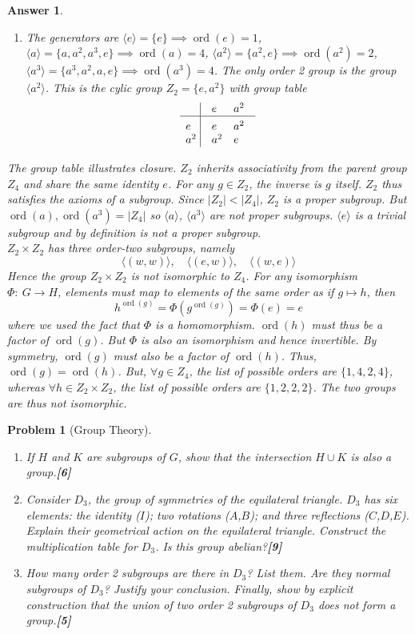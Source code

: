 \documentclass[a4paper]{article}
\DeclareMathOperator{\ord}{ord}
\newtheorem{ans}{Answer}[section]
\theoremstyle{new}
\newtheorem{qns}{Problem}[section]
\begin{document}
\begin{ans}
\begin{enumerate}[label=(\roman*)]
$${{    (w,w)  & (w,w)  &(w,e) & (e,w) & (e,e)     \cr
}}$$
\item The generators are $\langle e\rangle=\{e\}\implies\ord(e)=1$, $\langle a\rangle=\{a,a^2,a^3,e\}\implies\ord(a)=4$, $\langle a^2\rangle=\{a^2,e\}\implies\ord(a^2)=2$, $\langle a^3\rangle=\{a^3,a^2,a,e\}\implies\ord(a^3)=4$. The only order 2 group is the group $\langle a^2\rangle$. This is the cylic group $Z_2=\{e,a^2\}$ with group table
$$\vbox{\tabskip0.5em\offinterlineskip
    \halign{\strut$#$\hfil\ \tabskip1em\vrule&&$#$\hfil\cr
      & e&a^2     \cr
    \noalign{\hrule}\vrule height 12pt width 0pt
    e   & e&a^2      \cr
    a^2   & a^2&e      \cr
}}$$
\end{enumerate}
The group table illustrates closure. $Z_2$ inherits associativity from the parent group $Z_4$ and share the same identity $e$. For any $g\in Z_2$, the inverse is $g$ itself. $Z_2$ thus satisfies the axioms of a subgroup. Since $|Z_2|<|Z_4|$, $Z_2$ is a proper subgroup. But $\ord(a),\ord(a^3)=|Z_4|$ so $\langle a\rangle$, $\langle a^3\rangle$ are not proper subgroups. $\langle e\rangle$ is a trivial subgroup and by definition is not a proper subgroup.\\[5pt]
$Z_2\times Z_2$ has three order-two subgroups, namely 
$$\langle(w,w)\rangle,\quad\langle(e,w)\rangle,\quad\langle(w,e)\rangle$$
Hence the group $Z_2\times Z_2$ is not isomorphic to $Z_4$. For any isomorphism $\Phi:~G\rightarrow H$, elements must map to elements of the same order as if $g\mapsto h$, then 
$$h^{\ord(g)}=\Phi(g^{\ord(g)})=\Phi(e)=e$$
where we used the fact that $\Phi$ is a homomorphism. $\ord(h)$ must thus be a factor of $\ord(g)$. But $\Phi$ is also an isomorphism and hence invertible. By symmetry, $\ord(g)$ must also be a factor of $\ord(h)$. Thus, $\ord(g)=\ord(h)$. But, $\forall g\in Z_4$, the list of possible orders are $\{1,4,2,4\}$, whereas $\forall h\in Z_2\times Z_2$, the list of possible orders are $\{1,2,2,2\}$. The two groups are thus not isomorphic.
\end{ans}
\begin{qns}[Group Theory]\leavevmode
\begin{enumerate}[label=(\roman*)]
\item If $H$ and $K$ are subgroups of $G$, show that the intersection $H\cup K$ is also a group.\hfill\textbf{[6]}
\item Consider $D_3$, the group of symmetries of the equilateral triangle. $D_3$ has six elements: the identity ($I$); two rotations ($A$,$B$); and three reflections ($C$,$D$,$E$). Explain their geometrical action on the equilateral triangle. Construct the multiplication table for $D_3$. Is this group abelian?\hfill\textbf{[9]}
\item How many order 2 subgroups are there in $D_3$? List them. Are they normal subgroups of $D_3$? Justify your conclusion. Finally, show by explicit construction that the union of two order 2 subgroups of $D_3$ does not form a group.\hfill\textbf{[5]}
\end{enumerate}
\end{qns}
\end{document}
